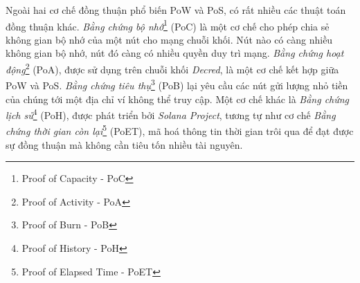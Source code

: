Ngoài hai cơ chế đồng thuận phổ biến PoW và PoS, có rất nhiều các thuật toán đồng thuận khác. \textit{Bằng chứng bộ nhớ}\footnote{Proof of Capacity - PoC} (PoC) là một cơ chế cho phép chia sẻ không gian bộ nhớ của một nút cho mạng chuỗi khối. Nút nào có càng nhiều không gian bộ nhớ, nút đó càng có nhiều quyền duy trì mạng. \textit{Bằng chứng hoạt động}\footnote{Proof of Activity - PoA} (PoA), được sử dụng trên chuỗi khối \textit{Decred}, là một cơ chế kết hợp giữa PoW và PoS. \textit{Bằng chứng tiêu thụ}\footnote{Proof of Burn - PoB} (PoB) lại yêu cầu các nút gửi lượng nhỏ tiền của chúng tới một địa chỉ ví không thể truy cập. Một cơ chế khác là \textit{Bằng chứng lịch sử}\footnote{Proof of History - PoH} (PoH), được phát triển bởi \textit{Solana Project}, tương tự như cơ chế \textit{Bằng chứng thời gian còn lại}\footnote{Proof of Elapsed Time - PoET} (PoET), mã hoá thông tin thời gian trôi qua để đạt được sự đồng thuận mà không cần tiêu tốn nhiều tài nguyên.